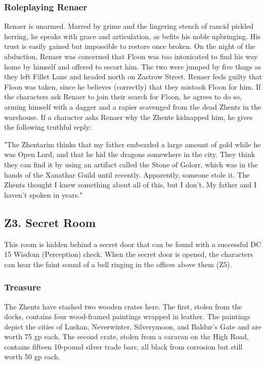 \documentclass[10pt,a4paper,twoside,twocolumn,openany,nodeprecatedcode]{dndbook}
\begin{document}
\subsubsection{Roleplaying Renaer}
Renaer is unarmed. Marred by grime and the lingering stench of rancid pickled herring, he speaks with grace and articulation, as befits his noble upbringing. His trust is easily gained but impossible to restore once broken.
On the night of the abduction, Renaer was concerned that Floon was too intoxicated to find his way home by himself and offered to escort him. The two were jumped by five thugs as they left Fillet Lane and headed north on Zastrow Street.
Renaer feels guilty that Floon was taken, since he believes (correctly) that they mistook Floon for him. If the characters ask Renaer to join their search for Floon, he agrees to do so, arming himself with a dagger and a rapier scavenged from the dead Zhents in the warehouse.
If a character asks Renaer why the Zhents kidnapped him, he gives the following truthful reply:
\begin{DndReadAloud}{}
"The Zhentarim thinks that my father embezzled a large amount of gold while he was Open Lord, and that he hid the dragons somewhere in the city. They think they can find it by using an artifact called the Stone of Golorr, which was in the hands of the Xanathar Guild until recently. Apparently, someone stole it. The Zhents thought I knew something about all of this, but I don't. My father and I haven't spoken in years."
\end{DndReadAloud}

\subsection{Z3. Secret Room}
This room is hidden behind a secret door that can be found with a successful DC 15 Wisdom (Perception) check. When the secret door is opened, the characters can hear the faint sound of a bell ringing in the offices above them (Z5).
\subsubsection{Treasure}
The Zhents have stashed two wooden crates here. The first, stolen from the docks, contains four wood-framed paintings wrapped in leather. The paintings depict the cities of Luskan, Neverwinter, Silverymoon, and Baldur's Gate and are worth 75 gp each.
The second crate, stolen from a caravan on the High Road, contains fifteen 10-pound silver trade bars, all black from corrosion but still worth 50 gp each.
\end{document}
